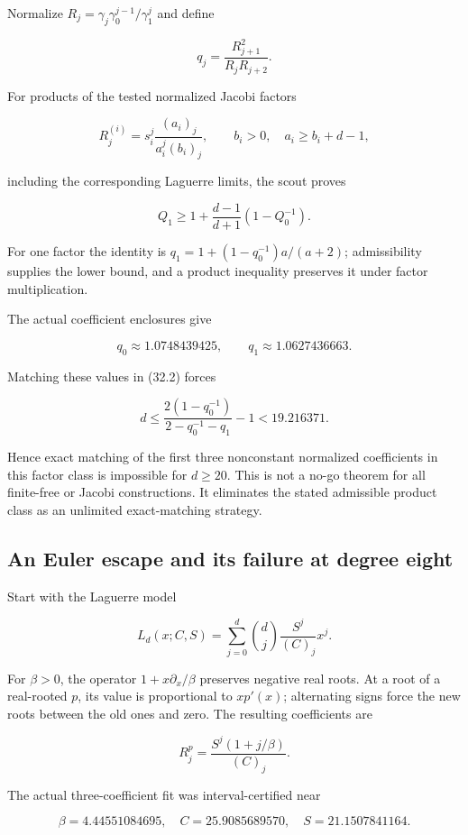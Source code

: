 \documentclass[
  10pt,
  a4paper,
  10pt,
  oneside,
  openany]{book}
\begin{document}
Normalize \(R_j=\gamma_j\gamma_0^{j-1}/\gamma_1^j\) and define

\[
 q_j=\frac{R_{j+1}^2}{R_jR_{j+2}}.
\]

For products of the tested normalized Jacobi factors

\[
 R_j^{(i)}=s_i^j\frac{(a_i)_j}{a_i^j(b_i)_j},
 \qquad b_i>0,\quad a_i\ge b_i+d-1,
\]

including the corresponding Laguerre limits, the scout proves

\[
 Q_1\ge1+\frac{d-1}{d+1}(1-Q_0^{-1}).
 \tag{32.2}\label{eq:32.2}
\]

For one factor the identity is \(q_1=1+(1-q_0^{-1})a/(a+2)\);
admissibility supplies the lower bound, and a product inequality
preserves it under factor multiplication.

The actual coefficient enclosures give

\[
 q_0\approx1.0748439425,\qquad q_1\approx1.0627436663.
\]

Matching these values in (32.2) forces

\[
 d\le\frac{2(1-q_0^{-1})}{2-q_0^{-1}-q_1}-1<19.216371.
\]

Hence exact matching of the first three nonconstant normalized
coefficients in this factor class is impossible for \(d\ge20\). This is
not a no-go theorem for all finite-free or Jacobi constructions. It
eliminates the stated admissible product class as an unlimited
exact-matching strategy.

\subsection{An Euler escape and its failure at degree
eight}\label{an-euler-escape-and-its-failure-at-degree-eight}

Start with the Laguerre model

\[
 L_d(x;C,S)=\sum_{j=0}^d\binom dj\frac{S^j}{(C)_j}x^j.
\]

For \(\beta>0\), the operator \(1+x\partial_x/\beta\) preserves negative
real roots. At a root of a real-rooted \(p\), its value is proportional
to \(xp'(x)\); alternating signs force the new roots between the old
ones and zero. The resulting coefficients are

\[
 R_j^p=\frac{S^j(1+j/\beta)}{(C)_j}.
 \tag{32.3}\label{eq:32.3}
\]

The actual three-coefficient fit was interval-certified near

\[
 \beta=4.44551084695,\quad
 C=25.9085689570,\quad S=21.1507841164.
\]
\end{document}

